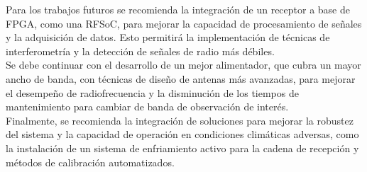 Para los trabajos futuros se recomienda la integración de un receptor a base de FPGA, como una RFSoC, para mejorar la capacidad de procesamiento de señales y la adquisición de datos. Esto permitirá la implementación de técnicas de interferometría y la detección de señales de radio más débiles.\\ 


Se debe continuar con el desarrollo de un mejor alimentador, que cubra un mayor ancho de banda, con técnicas de diseño de antenas más avanzadas, para mejorar el desempeño de radiofrecuencia y la disminución de los tiempos de mantenimiento para cambiar de banda de observación de interés.\\

Finalmente, se recomienda la integración de soluciones para mejorar la robustez del sistema y la capacidad de operación en condiciones climáticas adversas, como la instalación de un sistema de enfriamiento activo para la cadena de recepción y métodos de calibración automatizados.\\